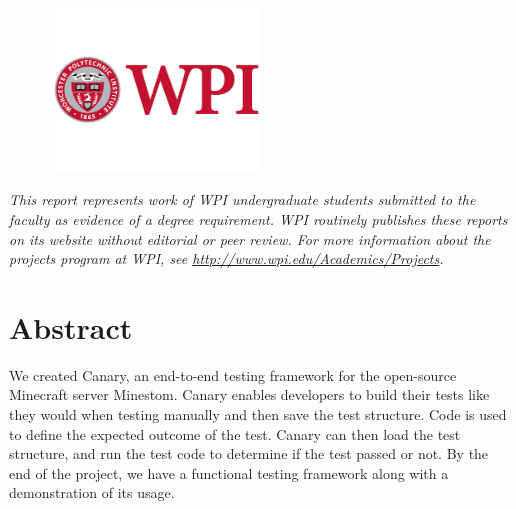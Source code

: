 \documentclass{article}
\begin{document}
\begin{center}
\begin{figure}[h]
    \includegraphics[width=0.5\textwidth]{Images/logo.png} %
    \end{figure}
    \large{\textit{This report represents work of WPI undergraduate students submitted to the faculty as evidence of a degree requirement. WPI routinely publishes these reports on its website without editorial or peer review. For more information about the projects program at WPI, see \url{http://www.wpi.edu/Academics/Projects}.}} %
\end{center}


\newpage %
\setcounter{page}{1} %

\section*{Abstract} %

We created Canary, an end-to-end testing framework for the open-source
Minecraft server Minestom. Canary enables developers to build their
tests like they would when testing manually and then save the test
structure. Code is used to define the expected outcome of the test.
Canary can then load the test structure, and run the test code to
determine if the test passed or not. By the end of the project, we have
a functional testing framework along with a demonstration of its usage.
\end{document}
